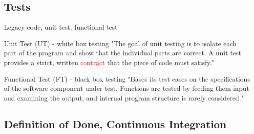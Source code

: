 \documentclass{beamer}
\begin{document}

\subsection{Tests}

\begin{frame}{Legacy code, unit test, functional test}




\begin{block}{Unit Test (UT) - white box testing}
"The goal of unit testing is to isolate each part of the program and show that the individual parts are correct. A unit test provides a strict, written \textcolor{red}{contract} \cite{dbc} that the piece of code must satisfy." \cite{ut}
\end{block}


\begin{block}{Functional Test (FT) - black box testing}
"Bases its test cases on the specifications of the software component under test. Functions are tested by feeding them input and examining the output, and internal program structure is rarely considered." \cite{ft}
\end{block}

\end{frame}


\subsection{Definition of Done,  Continuous Integration}
\end{document}
